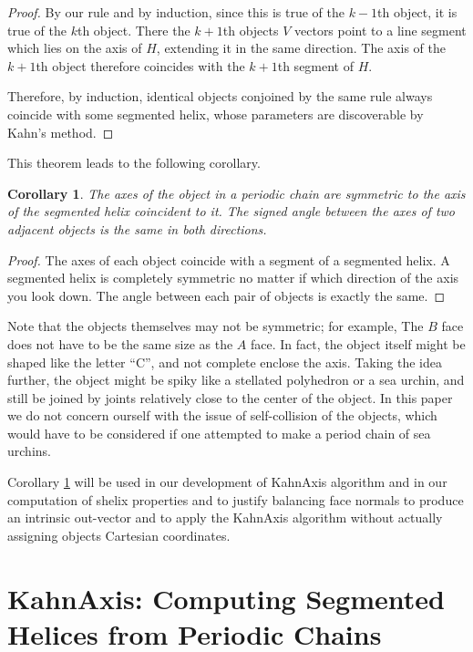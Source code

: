 \documentclass[11pt]{article}
\newtheorem{corollary}{Corollary}
\begin{document}
{\begin{proof}
  By our rule and by induction, since this is true of the $k-1$th object,
  it is true of the $k$th object. There the $k+1$th objects $V$ vectors
  point to a line segment which lies on the axis of $H$, extending it
  in the same direction. The axis of the $k+1$th object therefore coincides 
  with the $k+1$th segment of $H$. 

  Therefore, by induction, identical objects conjoined by the same rule always
  coincide with some segmented helix, whose parameters are discoverable by
  Kahn's method.
\end{proof}

This theorem leads to the following corollary.

\begin{corollary}
  The axes of the object in a periodic chain are symmetric to the axis of the
  segmented helix coincident to it. The signed angle between the axes of two adjacent
  objects is the same in both directions.
  \label{cor:symmetric}
\end{corollary}

\begin{proof}
  The axes of each object coincide with a segment of a segmented helix.
  A segmented helix is completely symmetric no matter if which direction
  of the axis you look down. The angle between each pair of objects
  is exactly the same.
\end{proof}

Note that the objects themselves may not be symmetric; for example,
The $B$ face does not have to be the same size as the $A$ face. In fact,
the object itself might be shaped like the letter ``C'', and not complete
enclose the axis. Taking the idea further, the object might be spiky
like a stellated polyhedron or a sea urchin, and still be joined by
joints relatively close to the center of the object. In this paper
we do not concern ourself with the issue of self-collision of the objects,
which would have to be considered if one attempted to make a period chain
of sea urchins.

Corollary \ref{cor:symmetric} will be used in our development of KahnAxis algorithm
and in our computation of shelix properties and to justify balancing face normals
to produce an intrinsic out-vector and to apply the KahnAxis algorithm
without actually assigning objects Cartesian coordinates.

\section{KahnAxis: Computing Segmented Helices from Periodic Chains}

}
\end{document}
